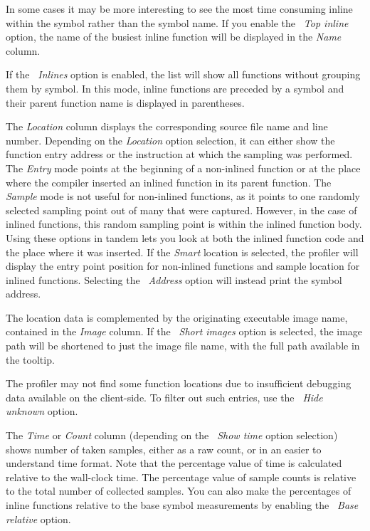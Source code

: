 \documentclass[hidelinks,titlepage,a4paper,twoside]{article}
\begin{document}
In some cases it may be more interesting to see the most time consuming inline within the symbol rather than the symbol name. If you enable the \emph{\faFire*~Top inline} option, the name of the busiest inline function will be displayed in the \emph{Name} column.

If the \emph{\faSitemap{}~Inlines} option is enabled, the list will show all functions without grouping them by symbol. In this mode, inline functions are preceded by a \faCaretRight{} symbol and their parent function name is displayed in parentheses.

The \emph{Location} column displays the corresponding source file name and line number. Depending on the \emph{Location} option selection, it can either show the function entry address or the instruction at which the sampling was performed. The \emph{Entry} mode points at the beginning of a non-inlined function or at the place where the compiler inserted an inlined function in its parent function. The \emph{Sample} mode is not useful for non-inlined functions, as it points to one randomly selected sampling point out of many that were captured. However, in the case of inlined functions, this random sampling point is within the inlined function body. Using these options in tandem lets you look at both the inlined function code and the place where it was inserted. If the \emph{Smart} location is selected, the profiler will display the entry point position for non-inlined functions and sample location for inlined functions. Selecting the \emph{\faAt{}~Address} option will instead print the symbol address.

The location data is complemented by the originating executable image name, contained in the \emph{Image} column. If the \emph{\faScissors{}~Short images} option is selected, the image path will be shortened to just the image file name, with the full path available in the tooltip.

The profiler may not find some function locations due to insufficient debugging data available on the client-side. To filter out such entries, use the \emph{\faEyeSlash{}~Hide unknown} option.

The \emph{Time} or \emph{Count} column (depending on the \emph{\faStopwatch{}~Show time} option selection) shows number of taken samples, either as a raw count, or in an easier to understand time format. Note that the percentage value of time is calculated relative to the wall-clock time. The percentage value of sample counts is relative to the total number of collected samples. You can also make the percentages of inline functions relative to the base symbol measurements by enabling the \emph{\faLink{}~Base relative} option.
\end{document}
